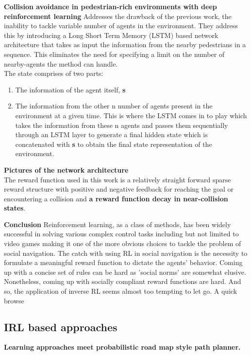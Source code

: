 \textbf{Collision avoidance in pedestrian-rich environments with deep reinforcement learning}
Addresses the drawback of the previous work, the inability to tackle variable number of agents in the environment. They address this by introducing a Long Short Term Memory (LSTM) based network architecture that takes as input the information from the nearby pedestrians in a sequence. This eliminates the need for specifying a limit on the number of nearby-agents the method can handle.\\
The state comprises of two parts: 
\begin{enumerate}
	\item The information of the agent itself, \textbf{s}
	\item The information from the other n number of agents present in the environment at a given time. This is where the LSTM comes in to play which takes the information from these n agents and passes them sequentially through an LSTM layer to generate a final hidden state which is concatenated with \textbf{s} to obtain the final state representation of the environment.
\end{enumerate}
\textbf{Pictures of the network architecture}
\\
The reward function used in this work is a relatively straight forward sparse reward structure with positive and negative feedback for reaching the goal or encountering a collision and \textbf{a reward function decay in near-collision states}.  

\textbf{Conclusion}
Reinforcement learning, as a class of methods, has been widely successful in solving various complex control tasks including but not limited to video games making it one of the more obvious choices to tackle the problem of social navigation. 
The catch with using RL in social navigation is the necessity to formulate a meaningful reward function to dictate the agents' behavior. Coming up with a concise set of rules can be hard as 'social norms' are somewhat elusive.\\
Nonetheless, coming up with socially compliant reward functions are hard. And so, the application of inverse RL seems almost too tempting to let go. A quick browse 
\subsection*{IRL based approaches}
\textbf{Learning approaches meet probabilistic road map style path planner.}


